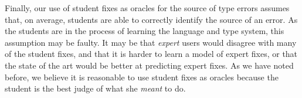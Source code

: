 Finally, our use of student fixes as oracles for the source of type
errors assumes that, on average, students are able to correctly identify
the source of an error.
%
As the students are in the process of learning the language and type
system, this assumption may be faulty.
%
It may be that \emph{expert} users would disagree with many of the
student fixes, and that it is harder to learn a model of expert fixes,
or that the state of the art would be better at predicting expert fixes.
%
As we have noted before, we believe it is reasonable to use student
fixes as oracles because the student is the best judge of what she
\emph{meant} to do.


